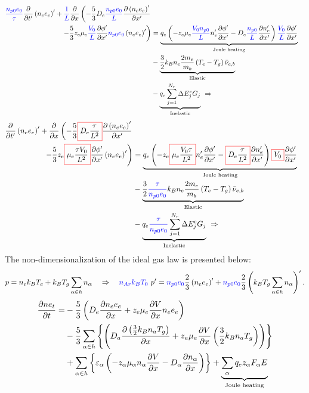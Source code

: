 \begin{align*}
{\color{blue}\frac{n_{p0} e_0}{\tau}} \frac{\partial }{\partial t'} \left( n_e e_e \right)' 
+
{\color{blue}\frac{1}{L}} \frac{\partial }{\partial x} \left( - \frac{5}{3} D_e {\color{blue}\frac{n_{p0} e_0}{L}} \frac{\partial \left(n_e e_e\right)'}{\partial x'}  \right. \\
\left. - \frac{5}{3}  z_e \mu_e {\color{blue}\frac{V_{0}}{L}} \frac{\partial \phi'}{\partial x'} {\color{blue}n_{p0} e_0} \left(n_e e_e\right)' \right)
&=
\underbrace{q_e \left(-z_{e} \mu_{e}  {\color{blue}\frac{V_{0} n_{p0}}{L}} n_{e}' \frac{\partial \phi'}{\partial x'} - D_{e}  {\color{blue}\frac{n_{p0}}{L}} \frac{\partial n_{e}'}{\partial x'} \right) {\color{blue}\frac{V_{0}}{L}} \frac{\partial \phi'}{\partial x'}}_{\textrm{Joule heating}} \\
&-
\underbrace{\frac{3}{2} k_B n_e \frac{2 m_e}{m_b} \left( T_e - T_g \right) \bar{\nu}_{e,b}}_{\textrm{Elastic}} \\
&-
\underbrace{q_e \sum_{j=1}^{N_r} \Delta E^e_j G_j}_{\textrm{Inelastic}} \ \Rightarrow
\end{align*}
\begin{align*}
\frac{\partial }{\partial t'} \left( n_e e_e \right)' 
+
\frac{\partial }{\partial x} \left( - \frac{5}{3} {\color{red}\boxed{\color{black} D_e \frac{\tau}{L^2}}} \color{black}\frac{\partial \left(n_e e_e\right)'}{\partial x'}  \right. \\
\left. - \frac{5}{3}  z_e  {\color{red}\boxed{\color{black} \mu_e \frac{\tau V_{0}}{L^2}}} \color{black}\frac{\partial \phi'}{\partial x'} \left(n_e e_e\right)' \right)
&=
\underbrace{q_e \left(-z_{e} {\color{red}\boxed{\color{black} \mu_{e} \frac{V_{0} \tau}{L^2}}} \color{black}n_{e}' \frac{\partial \phi'}{\partial x'} - {\color{red}\boxed{\color{black} D_{e} \frac{\tau}{L^2}}} \color{black} \frac{\partial n_{e}'}{\partial x'} \right) {\color{red}\boxed{\color{black} V_{0}}} \color{black} \frac{\partial \phi'}{\partial x'}}_{\textrm{Joule heating}} \\
&-
\underbrace{\frac{3}{2} {\color{blue}\frac{\tau}{n_{p0} e_0}} k_B n_e \frac{2 m_e}{m_b} \left( T_e - T_g \right) \bar{\nu}_{e,b}}_{\textrm{Elastic}} \\
&-
\underbrace{q_e {\color{blue}\frac{\tau}{n_{p0} e_0}} \sum_{j=1}^{N_r} \Delta E^e_j G_j}_{\textrm{Inelastic}} \ \Rightarrow
\end{align*}
%
The non-dimensionalization of the ideal gas law is presented below:
%
\begin{align*}
p = n_e k_B T_e + k_B T_g \sum_{\alpha \in h} n_{\alpha}  \quad \Rightarrow \quad {\color{blue} n_{Ar} k_B T_0} \ p' = {\color{blue} n_{p0} e_0} \frac{2}{3} \left(n_e e_e\right)' + {\color{blue} n_{p0} e_0}  \frac{2}{3} \left(k_B T_g \sum_{\alpha \in h} n_{\alpha} \right)'.
\end{align*}
%
\begin{align*}
\frac{\partial ne_t}{\partial t} = &- \frac{5}{3} \left( D_{e}\frac{\partial n_e e_e}{\partial x} + z_{e}\mu_{e} \frac{\partial V}{\partial x} n_e e_e \right) \\
 &- \frac{5}{3} \sum_{\alpha \in h} \left\{ \left( D_{a}\frac{\partial \left( \frac{3}{2} k_B  n_a T_g\right)}{\partial x} + z_{a} \mu_{a} \frac{\partial V}{\partial x} \left( \frac{3}{2} k_B n_a T_g\right) \right)  \right\} \\
 &+ \sum_{\alpha \in h} \left\{ \varepsilon_{\alpha} \left( - z_{\alpha} \mu_{\alpha} n_{\alpha} \frac{\partial V}{\partial x} - D_{\alpha} \frac{\partial n_{\alpha}}{\partial x} \right) \right\} +
\underbrace{\sum_{\alpha} q_e z_{\alpha} F_{\alpha} E}_{\textrm{Joule heating}}
\end{align*}
%